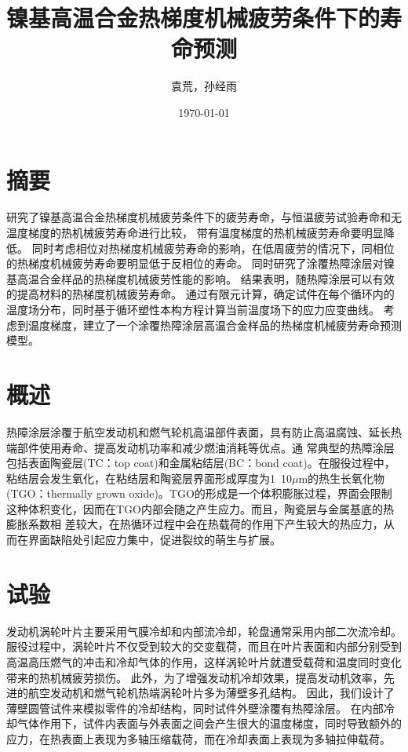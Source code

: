 \documentclass{article}
\begin{document}
\title{镍基高温合金热梯度机械疲劳条件下的寿命预测}

\author{袁荒，孙经雨}
\date{\today}
\maketitle
\tableofcontents

\section*{摘要}
研究了镍基高温合金热梯度机械疲劳条件下的疲劳寿命，与恒温疲劳试验寿命和无温度梯度的热机械疲劳寿命进行比较，
带有温度梯度的热机械疲劳寿命要明显降低。
同时考虑相位对热梯度机械疲劳寿命的影响，在低周疲劳的情况下，同相位的热梯度机械疲劳寿命要明显低于反相位的寿命。
同时研究了涂覆热障涂层对镍基高温合金样品的热梯度机械疲劳性能的影响。
结果表明，随热障涂层可以有效的提高材料的热梯度机械疲劳寿命。
通过有限元计算，确定试件在每个循环内的温度场分布，同时基于循环塑性本构方程计算当前温度场下的应力应变曲线。
考虑到温度梯度，建立了一个涂覆热障涂层高温合金样品的热梯度机械疲劳寿命预测模型。

\section{概述}
热障涂层涂覆于航空发动机和燃气轮机高温部件表面，具有防止高温腐蚀、延长热端部件使用寿命、提高发动机功率和减少燃油消耗等优点。通
常典型的热障涂层包括表面陶瓷层(TC：top coat)和金属粘结层(BC：bond coat)。在服役过程中，粘结层会发生氧化，在粘结层和陶瓷层界面形成厚度为1~10$\mu$m的热生长氧化物(TGO：thermally grown oxide)。TGO的形成是一个体积膨胀过程，界面会限制这种体积变化，因而在TGO内部会随之产生应力。而且，陶瓷层与金属基底的热膨胀系数相
差较大，在热循环过程中会在热载荷的作用下产生较大的热应力，从而在界面缺陷处引起应力集中，促进裂纹的萌生与扩展。
\section{试验}



发动机涡轮叶片主要采用气膜冷却和内部流冷却，轮盘通常采用内部二次流冷却。
服役过程中，涡轮叶片不仅受到较大的交变载荷，而且在叶片表面和内部分别受到高温高压燃气的冲击和冷却气体的作用，这样涡轮叶片就遭受载荷和温度同时变化带来的热机械疲劳损伤。
此外，为了增强发动机冷却效果，提高发动机效率，先进的航空发动机和燃气轮机热端涡轮叶片多为薄壁多孔结构。
因此，我们设计了薄壁圆管试件来模拟零件的冷却结构，同时试件外壁涂覆有热障涂层。
在内部冷却气体作用下，试件内表面与外表面之间会产生很大的温度梯度，同时导致额外的应力，在热表面上表现为多轴压缩载荷，而在冷却表面上表现为多轴拉伸载荷。
\end{document}
